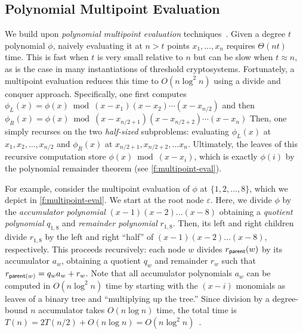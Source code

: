 \subsection{Polynomial Multipoint Evaluation}
\label{s:prelim:multipoint-eval}

We build upon \textit{polynomial multipoint evaluation} techniques~\cite{moderncomputeralgebra-ch10}.
Given a degree $t$ polynomial $\phi$, naively evaluating it at $n > t$ points $x_1, \dots, x_n$ requires $\Theta(nt)$ time.
This is fast when $t$ is very small relative to $n$ but can be slow when $t \approx n$, as is the case in many instantiations of threshold cryptosystems.
Fortunately, a multipoint evaluation reduces this time to $O(n\log^2{n})$ using a divide and conquer approach.
Specifically, one first computes $\phi_L(x)=\phi(x) \bmod (x-x_1)(x-x_2)\cdots(x-x_{n/2})$ and then $\phi_R(x)=\phi(x) \bmod (x-x_{n/2+1})(x-x_{n/2+2})\cdots(x-x_n)$
Then, one simply recurses on the two \textit{half-sized} subproblems: evaluating $\phi_L(x)$ at $x_1, x_2, \dots, x_{n/2}$ and $\phi_R(x)$ at $x_{n/2+1}, x_{n/2+2},\dots x_n$.
Ultimately, the leaves of this recursive computation store $\phi(x) \bmod (x-x_i)$, which is exactly $\phi(i)$ by the polynomial remainder theorem (see \cref{f:multipoint-eval}).

For example, consider the multipoint evaluation of $\phi$ at $\{1,2,\dots,8\}$, which we depict in \cref{f:multipoint-eval}.
We start at the root node $\varepsilon$.
Here, we divide $\phi$ by the \textit{accumulator polynomial} $(x-1)(x-2)\dots(x-8)$ obtaining a \textit{quotient polynomial} $q_{1,8}$ and \textit{remainder polynomial} $r_{1,8}$.
Then, its left and right children divide $r_{1,8}$ by the left and right ``half'' of $(x-1)(x-2)\dots(x-8)$, respectively.
This proceeds recursively: each node $w$ divides $r_{\mathsf{parent}}(w)$ by its accumulator $a_w$, obtaining a quotient $q_w$ and remainder $r_w$ such that $r_{\mathsf{parent}(w)} = q_w a_w + r_w$.
Note that all accumulator polynomials $a_w$ can be computed in $O(n\log^2{n})$ time by starting with the $(x-i)$ monomials as leaves of a binary tree and ``multiplying up the tree.''
Since division by a degree-bound $n$ accumulator takes $O(n\log{n})$ time, the total time is $T(n)=2T(n/2)+O(n\log{n}) = O(n\log^2{n})$~\cite{moderncomputeralgebra-ch10}.
